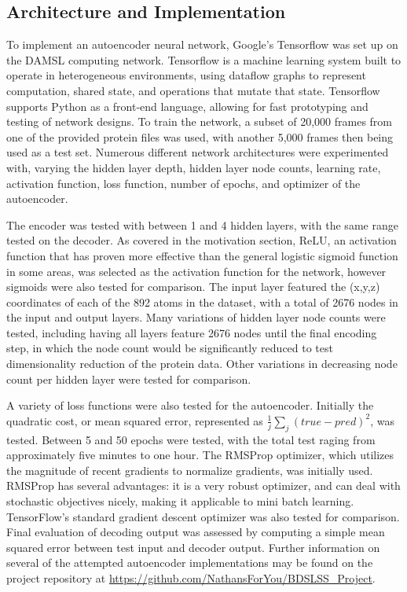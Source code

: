 \documentclass{article}
\begin{document}
	\subsection{Architecture and Implementation}
	To implement an autoencoder neural network, Google's Tensorflow was set up on the DAMSL computing network. Tensorflow is a machine learning system built to operate in heterogeneous environments, using dataflow graphs to represent computation, shared state, and operations that mutate that state. Tensorflow supports Python as a front-end language, allowing for fast prototyping and testing of network designs. To train the network, a subset of 20,000 frames from one of the provided protein files was used, with another 5,000 frames then being used as a test set. Numerous different network architectures were experimented with, varying the hidden layer depth, hidden layer node counts, learning rate, activation function, loss function, number of epochs, and optimizer of the autoencoder.
	
	The encoder was tested with between 1 and 4 hidden layers, with the same range tested on the decoder. As covered in the motivation section, ReLU, an activation function that has proven more effective than the general logistic sigmoid function in some areas, was selected as the activation function for the network, however sigmoids were also tested for comparison. The input layer featured the (x,y,z) coordinates of each of the 892 atoms in the dataset, with a total of 2676 nodes in the input and output layers. Many variations of hidden layer node counts were tested, including having all layers feature 2676 nodes until the final encoding step, in which the node count would be significantly reduced to test dimensionality reduction of the protein data. Other variations in decreasing node count per hidden layer were tested for comparison. 
	
	A variety of loss functions were also tested for the autoencoder. Initially the quadratic cost, or mean squared error, represented as $\frac{1}{j}\sum_{j}(true - pred)^2$, was tested. Between 5 and 50 epochs were tested, with the total test raging from approximately five minutes to one hour. The RMSProp optimizer, which utilizes the magnitude of recent gradients to normalize gradients, was initially used. RMSProp has several advantages: it is a very robust optimizer, and can deal with stochastic objectives nicely, making it applicable to mini batch learning. TensorFlow's standard gradient descent optimizer was also tested for comparison. Final evaluation of decoding output was assessed by computing a simple mean squared error between test input and decoder output. Further information on several of the attempted autoencoder implementations may be found on the project repository at \url{https://github.com/NathansForYou/BDSLSS_Project}.
	
\end{document}

